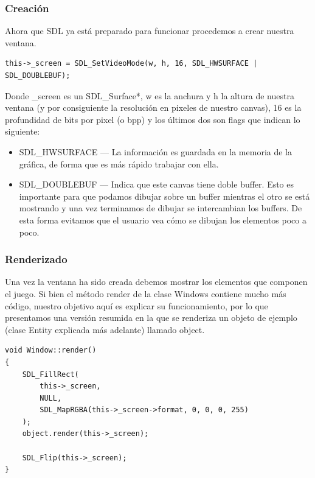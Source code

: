 \documentclass[parskip=half*]{scrartcl}
\begin{document}
			\subsubsection{Creaci\'on}
				Ahora que SDL ya est\'a preparado para funcionar procedemos a crear nuestra ventana.

				\begin{verbatim}
this->_screen = SDL_SetVideoMode(w, h, 16, SDL_HWSURFACE | SDL_DOUBLEBUF);
				\end{verbatim}

				Donde \_screen es un SDL\_Surface*, w es la anchura y h la altura de nuestra ventana (y por consiguiente la resoluci\'on en pixeles de nuestro canvas), 16 es la profundidad de bits por pixel (o bpp) y los \'ultimos dos son flags que indican lo siguiente:

				\begin{itemize}
					\item SDL\_HWSURFACE --- La informaci\'on es guardada en la memoria de la gr\'afica, de forma que es m\'as r\'apido trabajar con ella.

					\item SDL\_DOUBLEBUF --- Indica que este canvas tiene doble buffer. Esto es importante para que podamos dibujar sobre un buffer mientras el otro se est\'a mostrando y una vez terminamos de dibujar se intercambian los buffers. De esta forma evitamos que el usuario vea c\'omo se dibujan los elementos poco a poco.
				\end{itemize}

			\subsubsection{Renderizado}
				Una vez la ventana ha sido creada debemos mostrar los elementos que componen el juego. Si bien el m\'etodo render de la clase Windows contiene mucho m\'as c\'odigo, nuestro objetivo aqu\'i es explicar su funcionamiento, por lo que presentamos una versi\'on resumida en la que se renderiza un objeto de ejemplo (clase Entity explicada m\'as adelante) llamado object.

				\begin{verbatim}
void Window::render()
{
    SDL_FillRect(
    	this->_screen,
    	NULL,
    	SDL_MapRGBA(this->_screen->format, 0, 0, 0, 255)
    );
    object.render(this->_screen);

    SDL_Flip(this->_screen);
}
				\end{verbatim}
\end{document}
